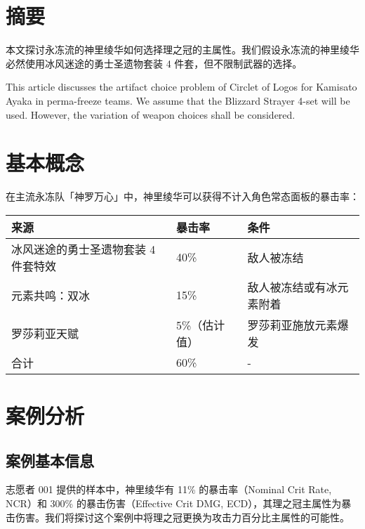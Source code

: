 \documentclass[a4paper,10pt]{article}
\begin{document}
\fulldoctitle


\section*{摘要}

本文探讨永冻流的神里绫华如何选择理之冠的主属性。我们假设永冻流的神里绫华必然使用冰风迷途的勇士圣遗物套装 4 件套，但不限制武器的选择。

This article discusses the artifact choice problem of Circlet of Logos for Kamisato Ayaka in perma-freeze teams.
We assume that the Blizzard Strayer 4-set will be used. However, the variation of weapon choices shall be considered.

\Nmaketoc


\section{基本概念}

在主流永冻队「神罗万心」中，神里绫华可以获得不计入角色常态面板的暴击率：

\begin{tabu}{|X|l|l|}
	\hline
	{来源}                                & {暴击率}                & {条件}                     \\
	\hline
	{冰风迷途的勇士圣遗物套装 4 件套特效} & {40\%}                  & {敌人被冻结}               \\
	{元素共鸣：双冰}                      & {15\%}                  & {敌人被冻结或有冰元素附着} \\
	{罗莎莉亚天赋}                        & {5\%\hfill{}（估计值）} & {罗莎莉亚施放元素爆发}     \\
	\hline
	{合计}                                & {60\%}                  & {-}                        \\
	\hline
\end{tabu}



\section{案例分析}

\subsection{案例基本信息}

志愿者 001 提供的样本中，神里绫华有 11\% 的暴击率（Nominal Crit Rate, NCR）和 300\% 的暴击伤害（Effective Crit DMG, ECD），其理之冠主属性为暴击伤害。我们将探讨这个案例中将理之冠更换为攻击力百分比主属性的可能性。
\end{document}
